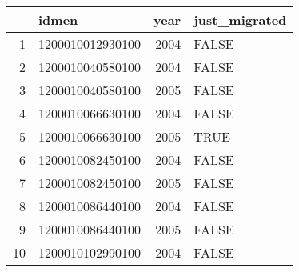 \begin{table}[ht]
\centering
\begin{tabular}{rlrl}
  \hline
 & idmen & year & just\_migrated \\ 
  \hline
1 & 1200010012930100 & 2004 & FALSE \\ 
  2 & 1200010040580100 & 2004 & FALSE \\ 
  3 & 1200010040580100 & 2005 & FALSE \\ 
  4 & 1200010066630100 & 2004 & FALSE \\ 
  5 & 1200010066630100 & 2005 & TRUE \\ 
  6 & 1200010082450100 & 2004 & FALSE \\ 
  7 & 1200010082450100 & 2005 & FALSE \\ 
  8 & 1200010086440100 & 2004 & FALSE \\ 
  9 & 1200010086440100 & 2005 & FALSE \\ 
  10 & 1200010102990100 & 2004 & FALSE \\ 
   \hline
\end{tabular}
\end{table}
